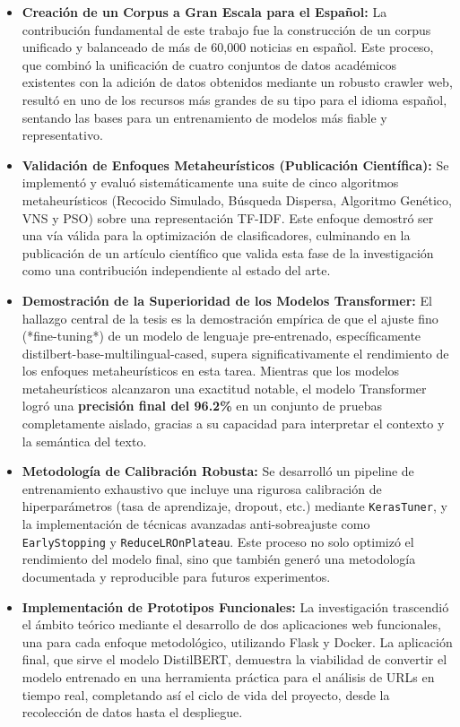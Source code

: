 \begin{itemize}
    \item \textbf{Creación de un Corpus a Gran Escala para el Español:} La contribución fundamental de este trabajo fue la construcción de un corpus unificado y balanceado de más de 60,000 noticias en español. Este proceso, que combinó la unificación de cuatro conjuntos de datos académicos existentes con la adición de datos obtenidos mediante un robusto crawler web, resultó en uno de los recursos más grandes de su tipo para el idioma español, sentando las bases para un entrenamiento de modelos más fiable y representativo.

    \item \textbf{Validación de Enfoques Metaheurísticos (Publicación Científica):} Se implementó y evaluó sistemáticamente una suite de cinco algoritmos metaheurísticos (Recocido Simulado, Búsqueda Dispersa, Algoritmo Genético, VNS y PSO) sobre una representación TF-IDF. Este enfoque demostró ser una vía válida para la optimización de clasificadores, culminando en la publicación de un artículo científico que valida esta fase de la investigación como una contribución independiente al estado del arte.

    \item \textbf{Demostración de la Superioridad de los Modelos Transformer:} El hallazgo central de la tesis es la demostración empírica de que el ajuste fino (*fine-tuning*) de un modelo de lenguaje pre-entrenado, específicamente distilbert-base-multilingual-cased, supera significativamente el rendimiento de los enfoques metaheurísticos en esta tarea. Mientras que los modelos metaheurísticos alcanzaron una exactitud notable, el modelo Transformer logró una \textbf{precisión final del 96.2\%} en un conjunto de pruebas completamente aislado, gracias a su capacidad para interpretar el contexto y la semántica del texto.

    \item \textbf{Metodología de Calibración Robusta:} Se desarrolló un pipeline de entrenamiento exhaustivo que incluye una rigurosa calibración de hiperparámetros (tasa de aprendizaje, dropout, etc.) mediante \texttt{KerasTuner}, y la implementación de técnicas avanzadas anti-sobreajuste como \texttt{EarlyStopping} y \texttt{ReduceLROnPlateau}. Este proceso no solo optimizó el rendimiento del modelo final, sino que también generó una metodología documentada y reproducible para futuros experimentos.

    \item \textbf{Implementación de Prototipos Funcionales:} La investigación trascendió el ámbito teórico mediante el desarrollo de dos aplicaciones web funcionales, una para cada enfoque metodológico, utilizando Flask y Docker. La aplicación final, que sirve el modelo DistilBERT, demuestra la viabilidad de convertir el modelo entrenado en una herramienta práctica para el análisis de URLs en tiempo real, completando así el ciclo de vida del proyecto, desde la recolección de datos hasta el despliegue.
\end{itemize}

